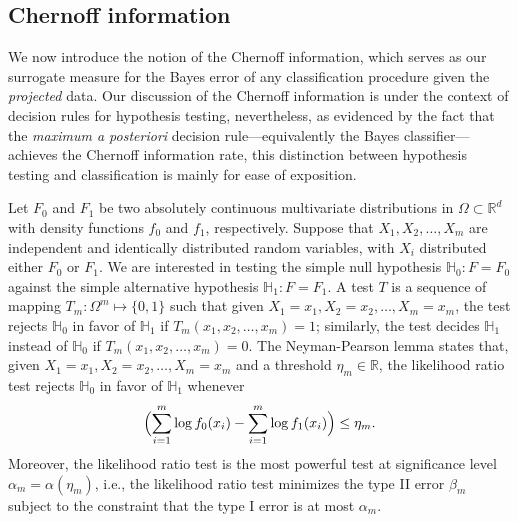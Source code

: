 \documentclass[11pt]{extarticle}
\begin{document}
\subsection{Chernoff information}
We now introduce the notion of the Chernoff information, which serves as our surrogate measure for the Bayes error of any classification procedure given the {\em projected} data. Our discussion of the Chernoff information is under the context of decision rules for hypothesis testing, nevertheless, as evidenced by the fact that the \emph{maximum a posteriori} decision rule---equivalently the Bayes classifier---achieves the Chernoff information rate, this distinction between hypothesis testing and classification is mainly for ease of exposition.

Let $F_0$ and $F_1$ be two absolutely continuous multivariate distributions in $\Omega \subset \mathbb{R}^{d}$ with density functions $f_0$ and $f_1$, respectively. Suppose that $X_1, X_2, \dots, X_m$ are independent and identically distributed random variables, with $X_i$ distributed either $F_0$ or $F_1$. We are interested in testing the simple null hypothesis $\mathbb{H}_0 \colon F = F_0$ against the simple alternative hypothesis $\mathbb{H}_1 \colon F = F_1$. A test $T$ is a sequence of mapping $T_m \colon \Omega^{m} \mapsto \{0,1\}$
such that given $X_1 = x_1, X_2 =x_2, \dots, X_m = x_m$, the test rejects $\mathbb{H}_0$ in favor of $\mathbb{H}_1$ if $T_m(x_1, x_2, \dots, x_m) = 1$; similarly, the test decides $\mathbb{H}_1$ instead of  $\mathbb{H}_0$ if $T_m(x_1, x_2, \dots, x_m) = 0$.
The Neyman-Pearson lemma states that, given $X_1 = x_1, X_2 = x_2, \dots, X_m = x_m$ and a threshold $\eta_m \in \mathbb{R}$, the likelihood ratio test rejects $\mathbb{H}_0$ in favor of $\mathbb{H}_1$ whenever
$$ \Bigl(\sum_{i=1}^{m} \log{f_0(x_i)} - \sum_{i=1}^{m} \log{f_1(x_i)} \Bigr) \leq \eta_m. $$
Moreover, the likelihood ratio test is the most powerful test at significance level $\alpha_m = \alpha(\eta_m)$, i.e., the likelihood ratio test minimizes the type II error $\beta_m$ subject to the constraint that the type I error is at most $\alpha_m$.
\end{document}
